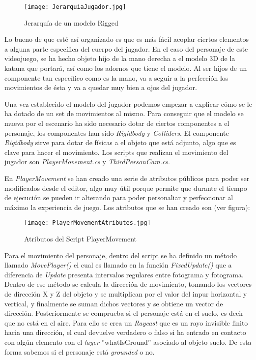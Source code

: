 \begin{figure}[H]
    \centering
    \texttt{[image: JerarquiaJugador.jpg]}
    \caption{Jerarquía de un modelo Rigged}
\end{figure}

Lo bueno de que esté así organizado es que es más fácil acoplar ciertos elementos a alguna parte específica del cuerpo del jugador. En el caso del personaje de este videojuego, se ha hecho objeto hijo de la mano derecha a el modelo 3D de la katana que portará, así como los adornos que tiene el modelo. Al ser hijos de un componente tan específico como es la mano, va a seguir a la perfección los movimientos de ésta y va a quedar muy bien a ojos del jugador.

Una vez establecido el modelo del jugador podemos empezar a explicar cómo se le ha dotado de un set de movimientos al mismo. Para conseguir que el modelo se mueva por el escenario ha sido necesario dotar de ciertos componentes a el personaje, los componentes han sido \textit{Rigidbody} y \textit{Colliders}. El componente \textit{Rigidbody} sirve para dotar de físicas a el objeto que está adjunto, algo que es clave para hacer el movimiento. Los scripts que realizan el movimiento del jugador son \textit{PlayerMovement.cs} y \textit{ThirdPersonCam.cs}. 

En \textit{PlayerMovement} se han creado una serie de atributos públicos para poder ser modificados desde el editor, algo muy útil porque permite que durante el tiempo de ejecución se pueden ir alterando para poder personaliar y perfeccionar al máximo la experiencia de juego. Los atributos que se han creado son (ver figura):

\begin{figure}[H]
    \centering
    \texttt{[image: PlayerMovementAtributes.jpg]}
    \caption{Atributos del Script PlayerMovement}
\end{figure}

Para el movimiento del personaje, dentro del script se ha definido un método llamado \textit{MovePlayer()} el cual es llamado en la función \textit{FixedUpdate()} que a diferencia de \textit{Update} presenta intervalos regulares entre fotograma y fotograma. Dentro de ese método se calcula la dirección de movimiento, tomando los vectores de dirección X y Z del objeto y se multiplican por el valor del inpur horizontal y vertical, y finalmente se suman dichos vectores y se obtiene un vector de dirección. Posteriormente se comprueba si el personaje está en el suelo, es decir que no está en el aire. Para ello se crea un \textit{Raycast} que es un rayo invisible finito hacia una dirección, el cual devuelve verdadero o falso si ha entrado en contacto con algún elemento con el \textit{layer} ''whatIsGround'' asociado al objeto suelo. De esta forma sabemos si el personaje está \textit{grounded} o no.

